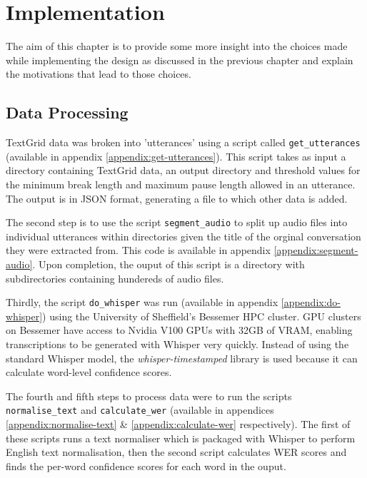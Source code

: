 \chapter{Implementation}\label{ch:implementation-and-testing}

The aim of this chapter is to provide some more insight into the choices made while implementing the design as discussed in the previous chapter and explain the motivations that lead to those choices.

\section{Data Processing}

TextGrid data was broken into 'utterances' using a script called \texttt{get\_utterances} (available in appendix \ref{appendix:get-utterances}).
This script takes as input a directory containing TextGrid data, an output directory and threshold values for the minimum break length and maximum pause length allowed in an utterance.
The output is in JSON format, generating a file to which other data is added.

The second step is to use the script \texttt{segment\_audio} to split up audio files into individual utterances within directories given the title of the orginal conversation they were extracted from.
This code is available in appendix \ref{appendix:segment-audio}.
Upon completion, the ouput of this script is a directory with subdirectories containing hundereds of audio files.

Thirdly, the script \texttt{do\_whisper} was run (available in appendix \ref{appendix:do-whisper}) using the University of Sheffield's Bessemer HPC cluster\cite{shef-hpc}.
GPU clusters on Bessemer have access to Nvidia V100 GPUs with 32GB of VRAM, enabling transcriptions to be generated with Whisper very quickly.
Instead of using the standard Whisper model, the \emph{whisper-timestamped} library is used because it can calculate word-level confidence scores.

The fourth and fifth steps to process data were to run the scripts \texttt{normalise\_text} and \texttt{calculate\_wer} (available in appendices \ref{appendix:normalise-text} \& \ref{appendix:calculate-wer} respectively).
The first of these scripts runs a text normaliser which is packaged with Whisper\cite{whisper} to perform English text normalisation, then the second script calculates WER scores and finds the per-word confidence scores for each word in the ouput.

